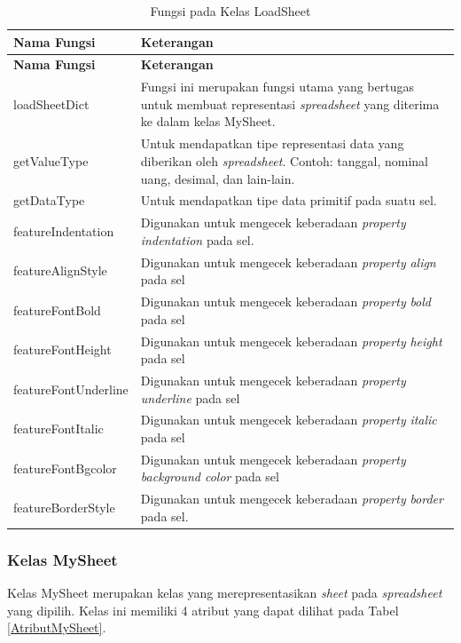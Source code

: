 	\begin{small}
	\begin{longtable}{ | p{4cm} | p{9cm} | }
	    \caption{Fungsi pada Kelas LoadSheet}
	    \label{FungsiLoadSheet}\\ \hline
	    \centering\bfseries{Nama Fungsi} & \centering\bfseries{Keterangan} \tabularnewline \hline
	    \endfirsthead
	    \hline
	    \centering\bfseries{Nama Fungsi} & \centering\bfseries{Keterangan} \tabularnewline \hline
	    \endhead
	    loadSheetDict & Fungsi ini merupakan fungsi utama yang bertugas untuk membuat representasi \textit{spreadsheet} yang diterima ke dalam kelas MySheet.\\ \hline
	    getValueType & Untuk mendapatkan tipe representasi data yang diberikan oleh \textit{spreadsheet}. Contoh: tanggal, nominal uang, desimal, dan lain-lain.\\ \hline
	    getDataType & Untuk mendapatkan tipe data primitif pada suatu sel.\\ \hline
	    featureIndentation & Digunakan untuk mengecek keberadaan \textit{property} \textit{indentation} pada sel.\\ \hline
	    featureAlignStyle & Digunakan untuk mengecek keberadaan \textit{property} \textit{align} pada sel\\ \hline
	    featureFontBold & Digunakan untuk mengecek keberadaan \textit{property} \textit{bold} pada sel\\ \hline
	    featureFontHeight & Digunakan untuk mengecek keberadaan \textit{property} \textit{height} pada sel\\ \hline
	    featureFontUnderline & Digunakan untuk mengecek keberadaan \textit{property} \textit{underline} pada sel\\ \hline
	    featureFontItalic & Digunakan untuk mengecek keberadaan \textit{property} \textit{italic} pada sel\\ \hline
	    featureFontBgcolor & Digunakan untuk mengecek keberadaan \textit{property} \textit{background color} pada sel\\ \hline
	    featureBorderStyle & Digunakan untuk mengecek keberadaan \textit{property} \textit{border} pada sel.\\ \hline
	\end{longtable}
	\end{small}

	\subsubsection{Kelas MySheet}
	Kelas MySheet merupakan kelas yang merepresentasikan \textit{sheet} pada \textit{spreadsheet} yang dipilih. Kelas ini memiliki 4 atribut yang dapat dilihat pada Tabel \ref{AtributMySheet}.

